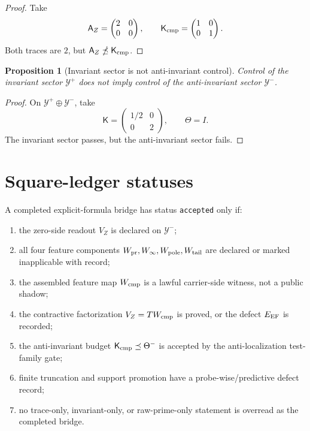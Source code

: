 \documentclass[11pt]{article}
\newtheorem{proposition}[theorem]{Proposition}
\newcommand{\K}{\mathsf K}
\newcommand{\A}{\mathsf A}
\newcommand{\Y}{\mathcal Y}
\begin{document}
\begin{proof}
Take
\[
  \A_Z=\begin{pmatrix}2&0\\0&0\end{pmatrix},
  \qquad
  \K_{\rm cmp}=\begin{pmatrix}1&0\\0&1\end{pmatrix}.
\]
Both traces are \(2\), but \(\A_Z\npreceq\K_{\rm cmp}\).
\end{proof}

\begin{proposition}[Invariant sector is not anti-invariant control]
Control of the invariant sector \(\Y^+\) does not imply control of the anti-invariant sector \(\Y^-\).
\end{proposition}

\begin{proof}
On \(\Y^+\oplus\Y^-\), take
\[
  \K=\begin{pmatrix}1/2&0\\0&2\end{pmatrix},
  \qquad
  \Theta=I.
\]
The invariant sector passes, but the anti-invariant sector fails.
\end{proof}

\section{Square-ledger statuses}

A completed explicit-formula bridge has status \texttt{accepted} only if:
\begin{enumerate}[label=\textup{G\arabic*.}]
  \item the zero-side readout \(V_Z\) is declared on \(\Y^-\);
  \item all four feature components \(W_{\rm pr},W_\infty,W_{\rm pole},W_{\rm tail}\) are declared or marked inapplicable with record;
  \item the assembled feature map \(W_{\rm cmp}\) is a lawful carrier-side witness, not a public shadow;
  \item the contractive factorization \(V_Z=T W_{\rm cmp}\) is proved, or the defect \(E_{\rm EF}\) is recorded;
  \item the anti-invariant budget \(\K_{\rm cmp}\preceq\Theta^-\) is accepted by the anti-localization test-family gate;
  \item finite truncation and support promotion have a probe-wise/predictive defect record;
  \item no trace-only, invariant-only, or raw-prime-only statement is overread as the completed bridge.
\end{enumerate}
\end{document}
